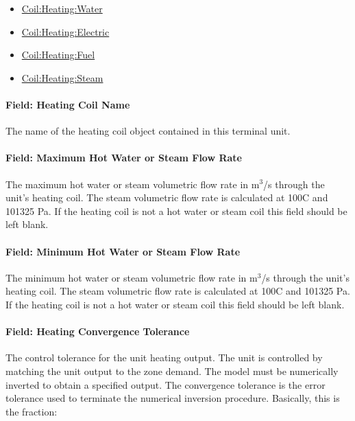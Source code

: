 \begin{itemize}
\item
  \hyperref[coilheatingwater]{Coil:Heating:Water}
\item
  \hyperref[coilheatingelectric]{Coil:Heating:Electric}
\item
  \hyperref[coilheatinggas-000]{Coil:Heating:Fuel}
\item
  \hyperref[coilheatingsteam]{Coil:Heating:Steam}
\end{itemize}

\paragraph{Field: Heating Coil Name}\label{field-heating-coil-name}

The name of the heating coil object contained in this terminal unit.

\paragraph{Field: Maximum Hot Water or Steam Flow Rate}\label{field-maximum-hot-water-or-steam-flow-rate-2}

The maximum hot water or steam volumetric flow rate in m\(^{3}\)/s through the unit's heating coil. The steam volumetric flow rate is calculated at 100C and 101325 Pa. If the heating coil is not a hot water or steam coil this field should be left blank.

\paragraph{Field: Minimum Hot Water or Steam Flow Rate}\label{field-minimum-hot-water-or-steam-flow-rate-2}

The minimum hot water or steam volumetric flow rate in m\(^{3}\)/s through the unit's heating coil. The steam volumetric flow rate is calculated at 100C and 101325 Pa. If the heating coil is not a hot water or steam coil this field should be left blank.

\paragraph{Field: Heating Convergence Tolerance}

The control tolerance for the unit heating output. The unit is controlled by matching the unit output to the zone demand. The model must be numerically inverted to obtain a specified output. The convergence tolerance is the error tolerance used to terminate the numerical inversion procedure. Basically, this is the fraction:

